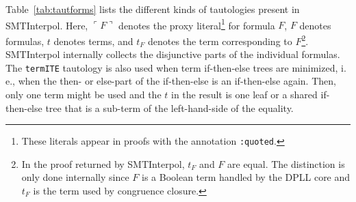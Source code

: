\documentclass[a4paper]{article}
\newcommand\si{SMTInterpol\xspace}
\newcommand\quoted[1]{\ulcorner #1 \urcorner}
\begin{document}
Table~\ref{tab:tautforms} lists the different kinds of tautologies present
in \si.  Here, $\quoted{F}$ denotes the proxy
literal\footnote{These literals appear in proofs with the annotation
  \texttt{:quoted}.} for formula $F$, $F$ denotes formulas, $t$ denotes terms,
and $t_F$ denotes the term corresponding to $F$\footnote{In the proof returned
  by \si, $t_F$ and $F$ are equal.  The distinction is only done internally
  since $F$ is a Boolean term handled by the DPLL core and $t_F$ is the term
  used by congruence closure.}.
\si internally collects the disjunctive parts of the individual formulas.  The
\texttt{termITE} tautology is also used when term if-then-else trees are
minimized, i.\,e., when the then- or else-part of the if-then-else is an
if-then-else again.  Then, only one term might be used and the $t$ in the
result is one leaf or a shared if-then-else tree that is a sub-term of the
left-hand-side of the equality.
\end{document}
